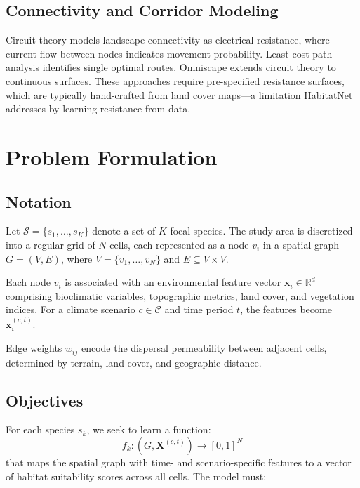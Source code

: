 \documentclass[11pt,a4paper]{article}
\newcommand{\R}{\mathbb{R}}
\newcommand{\Species}{\mathcal{S}}
\newcommand{\Climate}{\mathcal{C}}
\begin{document}
\subsection{Connectivity and Corridor Modeling}

Circuit theory \citep{mcrae2006isolation, mcrae2008using} models
landscape connectivity as electrical resistance, where current flow
between nodes indicates movement probability. Least-cost path analysis
\citep{adriaensen2003application} identifies single optimal routes.
Omniscape \citep{landau2021omnidirectional} extends circuit theory to
continuous surfaces. These approaches require pre-specified resistance
surfaces, which are typically hand-crafted from land cover maps---a
limitation HabitatNet addresses by learning resistance from data.


\section{Problem Formulation}
\label{sec:problem}

\subsection{Notation}

Let $\Species = \{s_1, \ldots, s_K\}$ denote a set of $K$ focal species.
The study area is discretized into a regular grid of $N$ cells, each
represented as a node $v_i$ in a spatial graph $G = (V, E)$, where $V =
\{v_1, \ldots, v_N\}$ and $E \subseteq V \times V$.

Each node $v_i$ is associated with an environmental feature vector
$\mathbf{x}_i \in \R^d$ comprising bioclimatic variables, topographic
metrics, land cover, and vegetation indices. For a climate scenario $c
\in \Climate$ and time period $t$, the features become
$\mathbf{x}_i^{(c,t)}$.

Edge weights $w_{ij}$ encode the dispersal permeability between adjacent
cells, determined by terrain, land cover, and geographic distance.

\subsection{Objectives}

For each species $s_k$, we seek to learn a function:
\begin{equation}
  f_k: (G, \mathbf{X}^{(c,t)}) \rightarrow [0,1]^N
\end{equation}
that maps the spatial graph with time- and scenario-specific features to
a vector of habitat suitability scores across all cells. The model must:
\end{document}
